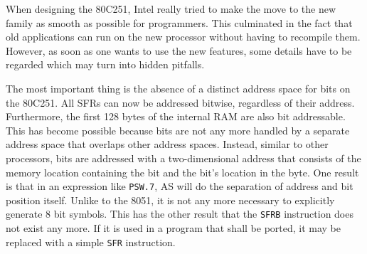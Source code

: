 \documentclass[12pt,twoside]{report}
\newcommand{\tty}[1]{{\tt #1}}
\begin{document}
When designing the 80C251, Intel really tried to make the move to
the new family as smooth as possible for programmers.  This
culminated in the fact that old applications can run on the new
processor without having to recompile them.  However, as soon as one
wants to use the new features, some details have to be regarded which
may turn into hidden pitfalls.

The most important thing is the absence of a distinct address space
for bits on the 80C251.  All SFRs can now be addressed bitwise,
regardless of their address.  Furthermore, the first 128 bytes of the
internal RAM are also bit addressable.  This has become possible
because bits are not any more handled by a separate address space
that overlaps other address spaces.  Instead, similar to other
processors, bits are addressed with a two-dimensional address that
consists of the memory location containing the bit and the bit's
location in the byte.  One result is that in an expression like
\tty{PSW.7}, AS will do the separation of address and bit position itself. 
Unlike to the 8051, it is not any more necessary to explicitly
generate 8 bit symbols.  This has the other result that the \tty{SFRB}
instruction does not exist any more.  If it is used in a program that
shall be ported, it may be replaced with a simple \tty{SFR} instruction.
\end{document}
